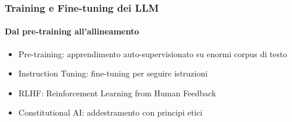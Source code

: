 %
\begin{frame}[t,fragile] \frametitle{Training e Fine-tuning dei LLM}
	{\scriptsize
		\onslide<1->
            \framesubtitle{Dal pre-training all'allineamento}
            \vspace*{-10pt}
	    	\begin{minipage}[t]{\textwidth}
				\begin{minipage}[t]{0.6\textwidth}
	    			\begin{itemize}[leftmargin=10pt,align=right]
						\onslide<2->\item[\alert{\faHandORight}] \alert{Pre-training:} apprendimento auto-supervisionato su enormi corpus di testo
						\onslide<3->\item[\alert{\faHandORight}] \alert{Instruction Tuning:} fine-tuning per seguire istruzioni
						\onslide<4->\item[\alert{\faHandORight}] \alert{RLHF:} Reinforcement Learning from Human Feedback
						\onslide<5->\item[\alert{\faHandORight}] \alert{Constitutional AI:} addestramento con principi etici
					\end{itemize}
            	\end{minipage}
	    	\end{minipage}
	}
\end{frame}
%
